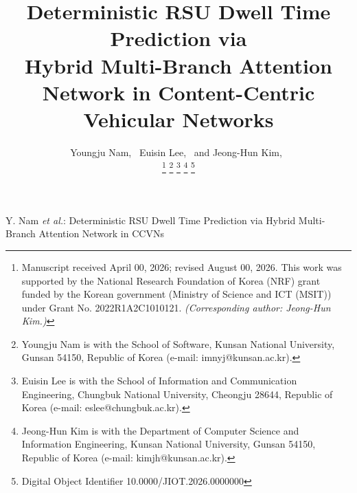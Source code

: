 \documentclass[journal]{IEEEtran}
\begin{document}
\title{Deterministic RSU Dwell Time Prediction via\\Hybrid Multi-Branch Attention Network in Content-Centric Vehicular Networks}

\newcommand{\orcidauthorA}{0000-0003-3971-0715} %
\newcommand{\orcidauthorC}{0000-0002-0422-0647} %
\newcommand{\orcidauthorB}{0000-0001-8209-5944} %

\author{Youngju Nam,~
        Euisin Lee,~
        and Jeong-Hun Kim,~

\thanks{Manuscript received April 00, 2026; revised August 00, 2026.
This work was supported by the National Research Foundation of Korea (NRF) grant funded by the Korean government (Ministry of Science and ICT (MSIT)) under Grant No. 2022R1A2C1010121.
\textit{(Corresponding author: Jeong-Hun Kim.)}}
\thanks{Youngju Nam is with the School of Software, Kunsan National University,
Gunsan 54150, Republic of Korea (e-mail: imnyj@kunsan.ac.kr).}
\thanks{Euisin Lee is with the School of Information and Communication Engineering,
Chungbuk National University, Cheongju 28644, Republic of Korea (e-mail: eslee@chungbuk.ac.kr).}
\thanks{Jeong-Hun Kim is with the Department of Computer Science and Information Engineering,
Kunsan National University, Gunsan 54150, Republic of Korea (e-mail: kimjh@kunsan.ac.kr).}
\thanks{Digital Object Identifier 10.0000/JIOT.2026.0000000}}

%
{Y. Nam \MakeLowercase{\textit{et al.}}: Deterministic RSU Dwell Time Prediction via Hybrid Multi-Branch Attention Network in CCVNs}


\maketitle
\end{document}

